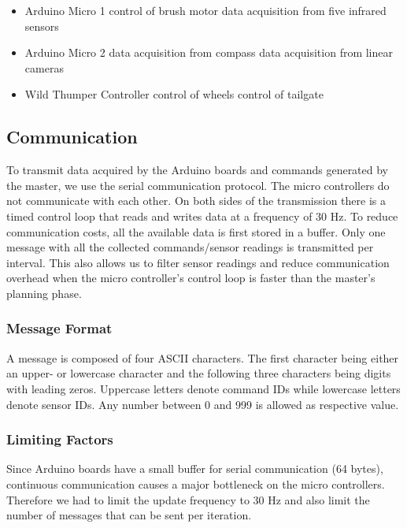 \begin{itemize}
    \item Arduino Micro 1
    \subitem control of brush motor
    \subitem data acquisition from five infrared sensors
    
    \item Arduino Micro 2
    \subitem data acquisition from compass 
    \subitem data acquisition from linear cameras

    \item Wild Thumper Controller
    \subitem control of wheels
    \subitem control of tailgate
\end{itemize}

\subsection{Communication}
To transmit data acquired by the Arduino boards and commands generated by the master,
we use the serial communication protocol. The micro controllers do not communicate with
each other. On both sides of the transmission there is a timed control loop that reads
and writes data at a frequency of 30 Hz. To reduce communication costs, all the available
data is first stored in a buffer. Only one message with all the collected commands/sensor
readings is transmitted per interval. This also allows us to filter sensor readings
and reduce communication overhead when the micro controller's control loop is faster 
than the master's planning phase.

\subsubsection{Message Format}
A message is composed of four ASCII characters. The first character being either an
upper- or lowercase character and the following three characters being digits with
leading zeros. Uppercase letters denote command IDs while lowercase letters denote
sensor IDs. Any number between 0 and 999 is allowed as respective value. 

\subsubsection{Limiting Factors}
Since Arduino boards have a small buffer for serial communication (64 bytes), continuous
communication causes a major bottleneck on the micro controllers. Therefore we 
had to limit the update frequency to 30 Hz and also limit the number of messages
that can be sent per iteration.


